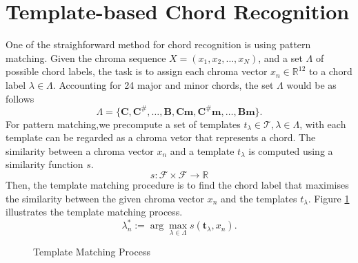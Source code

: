 \documentclass[a4paper, 9pt, twocolumn]{extarticle}
\begin{document}
\section{Template-based Chord Recognition}
\label{section:template_recognition}
One of the straighforward method for chord recognition is using pattern matching. Given the chroma sequence $X = (x_1, x_2, \ldots, x_N)$, and a set $\Lambda$ of possible chord labels, the task is to assign each chroma vector $x_n \in \mathbb{R}^{12}$ to a chord label $\lambda \in \Lambda$.
Accounting for 24 major and minor chords, the set $\Lambda$ would be as follows
\begin{equation}
    \Lambda = \{\mathbf{C, C^\#, \ldots, B, Cm, C^\#m, \ldots, Bm }\}.
\end{equation}
For pattern matching,we precompute a set of templates $t_\lambda \in \mathcal{T}, \lambda \in \Lambda$, with each template can be regarded as a chroma vetor that represents a chord. The similarity between a chroma vector $x_n$ and a template $t_\lambda$ is computed using a similarity function $s$.
\begin{equation}
    s: \mathcal{F} \times \mathcal{F} \rightarrow \mathbb{R}
\end{equation}
Then, the template matching procedure is to find the chord label that maximises the similarity between the given chroma vector $x_n$ and the templates $t_\lambda$. Figure \ref{figure:template_matching} illustrates the template matching process.
\begin{equation}
    \lambda_n^* := \arg \max_{\lambda \in \Lambda} s(\mathbf{t}_\lambda,x_n).
\end{equation}

\begin{figure}[t]
    \label{figure:template_matching}
    \caption{Template Matching Process}
\end{figure}
\end{document}
